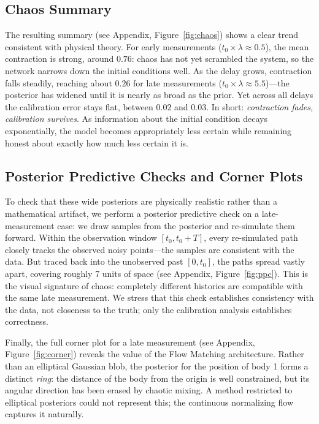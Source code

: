 \documentclass[12pt]{article}
\begin{document}
\subsection{Chaos Summary}
The resulting summary (see Appendix, Figure~\ref{fig:chaos}) shows a clear trend consistent with physical theory.
For early measurements ($t_0 \times \lambda \approx 0.5$), the mean contraction is strong, around
$0.76$: chaos has not yet scrambled the system, so the network narrows down the initial conditions
well. As the delay grows, contraction falls steadily, reaching about $0.26$ for late measurements
($t_0 \times \lambda \approx 5.5$)---the posterior has widened until it is nearly as broad as the
prior. Yet across all delays the calibration error stays flat, between $0.02$ and $0.03$. In short:
\emph{contraction fades, calibration survives}. As information about the initial condition decays
exponentially, the model becomes appropriately less certain while remaining honest about exactly how
much less certain it is.
 
\subsection{Posterior Predictive Checks and Corner Plots}
To check that these wide posteriors are physically realistic rather than a mathematical artifact, we perform a posterior predictive check on a late-measurement case: we draw samples from the posterior and re-simulate them forward. Within the observation window $[t_0, t_0+T]$, every re-simulated path closely tracks the observed noisy points---the samples are consistent with the data. But traced back
into the unobserved past $[0, t_0]$, the paths spread vastly apart, covering roughly 7 units of space
(see Appendix, Figure~\ref{fig:ppc}). This is the visual signature of chaos: completely different histories are
compatible with the same late measurement. We stress that this check establishes consistency with the
data, not closeness to the truth; only the calibration analysis establishes correctness.
 
Finally, the full corner plot for a late measurement (see Appendix, Figure~\ref{fig:corner}) reveals the value of the
Flow Matching architecture. Rather than an elliptical Gaussian blob, the posterior for the position of
body 1 forms a distinct \emph{ring}: the distance of the body from the origin is well constrained, but
its angular direction has been erased by chaotic mixing. A method restricted to elliptical posteriors
could not represent this; the continuous normalizing flow captures it naturally.
 
\end{document}
